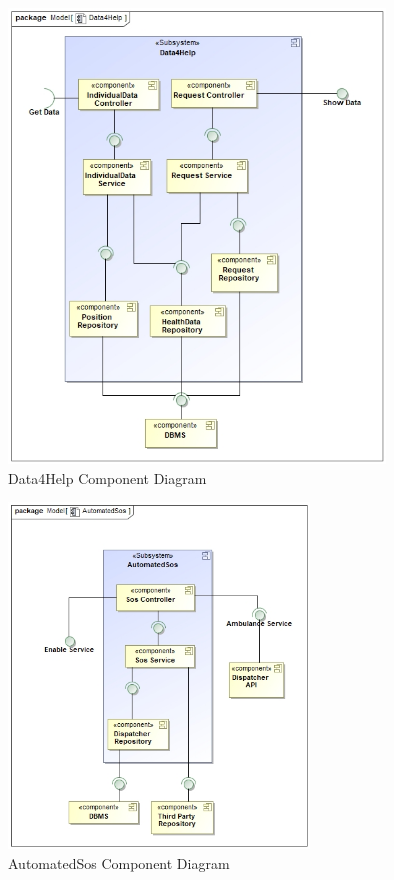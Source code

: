 \documentclass[a4paper]{article}
\begin{document}
\begin{figure}[!htpb]
    \centering
    \includegraphics[width=100mm,keepaspectratio]{DD/images/UML/component_Data4Help.jpg}
    \caption{Data4Help Component Diagram}
    \label{fig:component_data4help}
\end{figure}
\begin{figure}[!htpb]
    \centering
    \includegraphics[width=80mm,keepaspectratio]{DD/images/UML/component_AutomatedSos.jpg}
    \caption{AutomatedSos Component Diagram}
    \label{fig:component_automatedsos}
\end{figure}
\end{document}
